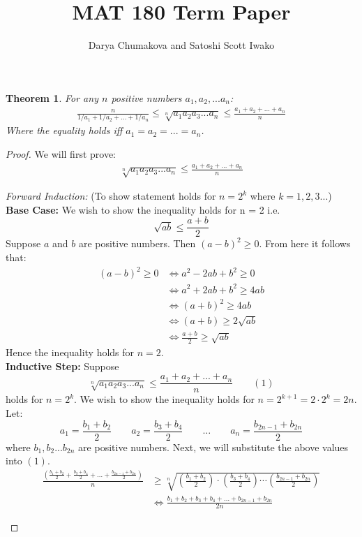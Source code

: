 \documentclass[12pt]{extreport}
\newtheorem*{thm}{Theorem}
\begin{document}
\title{MAT 180 Term Paper}
\author{Darya Chumakova and Satoshi Scott Iwako}
\maketitle

\begin{thm}
For any $n$ positive numbers $a_1, a_2, ... a_n$: 
\begin{align*}
\frac{n}{1/a_1 + 1/a_2 + ... + 1/a_n} \leq \sqrt[n]{a_1 a_2 a_3 ... a_n} \leq \frac{a_1 + a_2 + ... + a_n}{n}
\end{align*}
Where the equality holds iff $a_1 = a_2 = ... = a_n$.
\end{thm}

\begin{proof}
We will first prove:
\begin{align*}
\sqrt[n]{a_1 a_2 a_3 ... a_n} \leq \frac{a_1 + a_2 + ... + a_n}{n}
\end{align*}

\begin{flushleft}
\textit{Forward Induction:} (To show statement holds for $n = 2^k$ where $k = 1, 2, 3...$) \\
\textbf{Base Case:} We wish to show the inequality holds for n = 2 i.e. $$\sqrt{ab} \leq \frac{a+b}{2}$$
Suppose $a$ and $b$ are positive numbers. Then $(a-b)^2 \geq 0$. From here it follows that:
\begin{align*}
(a-b)^2 \geq 0 &\iff a^2 - 2ab + b^2 \geq 0 \\
			   &\iff a^2 + 2ab + b^2 \geq 4ab \\
			   &\iff (a+b)^2 \geq 4ab \\
			   &\iff (a+b) \geq 2\sqrt{ab} \\
			   &\iff \frac{a+b}{2} \geq \sqrt{ab}
\end{align*}
Hence the inequality holds for $n=2$.\\
\textbf{Inductive Step:} Suppose $$\sqrt[n]{a_1 a_2 a_3 ... a_n} \leq \frac{a_1 + a_2 + ... + a_n}{n} \qquad (1)$$ holds for $n = 2^k$. We wish to show the inequality holds for $n = 2^{k+1} = 2 \cdot 2^k = 2n$. Let:
$$a_1 = \frac{b_1 + b_2}{2} \qquad a_2 = \frac{b_3 + b_4}{2} \qquad \ldots \qquad a_n = \frac{b_{2n-1} + b_{2n}}{2}$$
where $b_1, b_2 ... b_{2n}$ are positive numbers. Next, we will substitute the above values into $(1)$. 
\begin{align*}
\frac{ (\frac{b_1 + b_2}{2} + \frac{b_3 + b_4}{2} + \ldots + \frac{b_{2n-1} + b_{2n}}{2}) } {n} &\geq \sqrt[n]{(\frac{b_1 + b_2}{2})\cdot(\frac{b_3 + b_4}{2})\cdots (\frac{b_{2n-1} + b_{2n}}{2})} \\&\iff
\frac{b_1 + b_2 + b_3 + b_4 + \ldots + b_{2n-1} + b_{2n}}{2n}
\end{align*}

\end{flushleft}
\end{proof}
\end{document}
